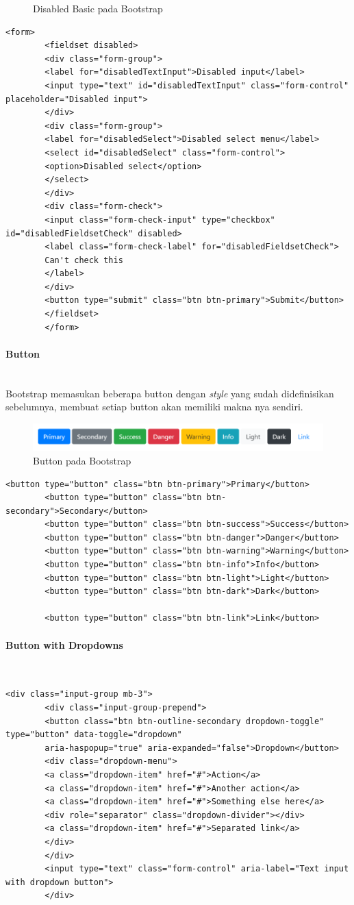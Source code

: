 \documentclass[a4paper,twoside]{article}
\newcommand{\myparagraph}[1]{\paragraph{#1}\mbox{}\\}
\begin{document}
\begin{enumerate}
\begin{figure} [H]
			\caption{Disabled Basic pada Bootstrap} 
		\end{figure}
		\begin{lstlisting}[frame=single, basicstyle=\tiny] 
		<form>
		<fieldset disabled>
		<div class="form-group">
		<label for="disabledTextInput">Disabled input</label>
		<input type="text" id="disabledTextInput" class="form-control" placeholder="Disabled input">
		</div>
		<div class="form-group">
		<label for="disabledSelect">Disabled select menu</label>
		<select id="disabledSelect" class="form-control">
		<option>Disabled select</option>
		</select>
		</div>
		<div class="form-check">
		<input class="form-check-input" type="checkbox" id="disabledFieldsetCheck" disabled>
		<label class="form-check-label" for="disabledFieldsetCheck">
		Can't check this
		</label>
		</div>
		<button type="submit" class="btn btn-primary">Submit</button>
		</fieldset>
		</form>
		\end{lstlisting}
		\myparagraph{Button}
		Bootstrap memasukan beberapa button dengan \textit{style} yang sudah didefinisikan sebelumnya, membuat setiap button akan memiliki makna nya sendiri.
		\begin{figure} [H]
			\centering  
			\includegraphics[scale=0.7]{buttons_bootstrap.png}  
			\caption{Button pada Bootstrap} 
		\end{figure}
		\begin{lstlisting}[frame=single] 
		<button type="button" class="btn btn-primary">Primary</button>
		<button type="button" class="btn btn-secondary">Secondary</button>
		<button type="button" class="btn btn-success">Success</button>
		<button type="button" class="btn btn-danger">Danger</button>
		<button type="button" class="btn btn-warning">Warning</button>
		<button type="button" class="btn btn-info">Info</button>
		<button type="button" class="btn btn-light">Light</button>
		<button type="button" class="btn btn-dark">Dark</button>
		
		<button type="button" class="btn btn-link">Link</button>
		\end{lstlisting}
		
		
		\myparagraph{Button with Dropdowns}
		\begin{lstlisting}[frame=single, basicstyle=\tiny]
		<div class="input-group mb-3">
		<div class="input-group-prepend">
		<button class="btn btn-outline-secondary dropdown-toggle" type="button" data-toggle="dropdown"
		aria-haspopup="true" aria-expanded="false">Dropdown</button>
		<div class="dropdown-menu">
		<a class="dropdown-item" href="#">Action</a>
		<a class="dropdown-item" href="#">Another action</a>
		<a class="dropdown-item" href="#">Something else here</a>
		<div role="separator" class="dropdown-divider"></div>
		<a class="dropdown-item" href="#">Separated link</a>
		</div>
		</div>
		<input type="text" class="form-control" aria-label="Text input with dropdown button">
		</div>
		

\end{lstlisting}
\end{enumerate}
\end{document}
